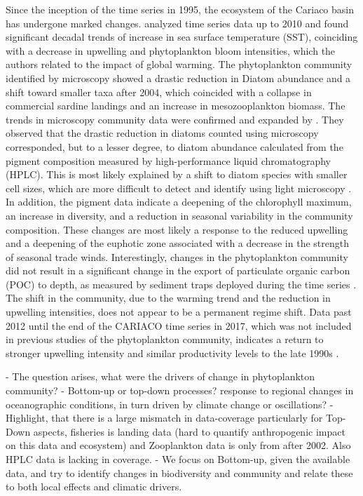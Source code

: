 \documentclass[draft]{agujournal2019}
\begin{document}
    Since the inception of the time series in 1995, the ecosystem of the Cariaco basin has undergone marked changes.  analyzed time series data up to 2010 and found significant decadal trends of increase in sea surface temperature (SST), coinciding with a decrease in upwelling and phytoplankton bloom intensities, which the authors related to the impact of global warming. The phytoplankton community identified by microscopy showed a drastic reduction in Diatom abundance and a shift toward smaller taxa after 2004, which coincided with a collapse in commercial sardine landings and an increase in mesozooplankton biomass.
    The trends in microscopy community data were confirmed and expanded by . They observed that the drastic reduction in diatoms counted using microscopy corresponded, but to a lesser degree, to diatom abundance calculated from the pigment composition measured by high-performance liquid chromatography (HPLC). This is most likely explained by a shift to diatom species with smaller cell sizes, which are more difficult to detect and identify using light microscopy \cite{lorenzoni_characterization_2015}. In addition, the pigment data indicate a deepening of the chlorophyll maximum, an increase in diversity, and a reduction in seasonal variability in the community composition. These changes are most likely a response to the reduced upwelling and a deepening of the euphotic zone associated with a decrease in the strength of seasonal trade winds. Interestingly, changes in the phytoplankton community did not result in a significant change in the export of particulate organic carbon (POC) to depth, as measured by sediment traps deployed during the time series \cite{pinckney_phytoplankton_2015}.
    The shift in the community, due to the warming trend and the reduction in upwelling intensities, does not appear to be a permanent regime shift. Data past 2012 until the end of the CARIACO time series in 2017, which was not included in previous studies of the phytoplankton community, indicates a return to stronger upwelling intensity and similar productivity levels to the late 1990s \cite{muller-karger_scientific_2019}.

    - The question arises, what were the drivers of change in phytoplankton community?
    - Bottom-up or top-down processes? response to regional changes in oceanographic conditions, in turn driven by climate change or oscillations?
    - Highlight, that there is a large mismatch in data-coverage particularly for Top-Down aspects, fisheries is landing data (hard to quantify anthropogenic impact on this data and ecosystem) and Zooplankton data is only from after 2002. Also HPLC data is lacking in coverage.
    - We focus on Bottom-up, given the available data, and try to identify changes in biodiversity and community and relate these to both local effects and climatic drivers.
    
\end{document}
